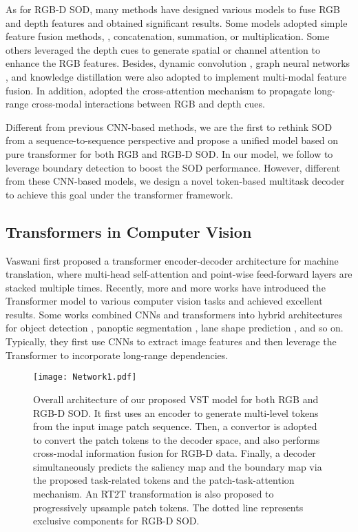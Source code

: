\documentclass[10pt,twocolumn,letterpaper]{article}
\begin{document}
As for RGB-D SOD, 
many methods have designed various models to fuse RGB and depth features and obtained significant results.
Some models \cite{chen2018progressively, chen2019three, Fu2020JLDCF} adopted simple feature fusion methods, \ie, concatenation, summation, or multiplication.
Some others \cite{zhao2019contrast, li2020icnet, Piao2019dmra, Li2020CMWNet} leveraged the depth cues to generate spatial or channel attention to enhance the RGB features.
Besides, dynamic convolution \cite{HDFNet-ECCV2020}, graph neural networks \cite{luo2020Cas-Gnn}, and knowledge distillation \cite{piao2020a2dele} were also adopted to implement multi-modal feature fusion.
In addition, \cite{liu2020S2MA, liu2020ReDWeb-S, chen2020dpanet} adopted the cross-attention mechanism to propagate long-range cross-modal interactions between RGB and depth cues.

Different from previous CNN-based methods, we are the first to rethink SOD from a sequence-to-sequence perspective and propose a unified model based on pure transformer 
for both RGB and RGB-D SOD. In our model, we follow \cite{qin2019basnet, zhao2019EGNet,CVPR2020_LDF,zhang2020select,Wei2020CoNet} to leverage boundary detection to boost the SOD performance. However, different from these CNN-based models, we design a novel token-based multitask decoder to achieve this goal under the transformer framework.

\subsection{Transformers in Computer Vision}
Vaswani \etal \cite{vaswani2017attention} first proposed a transformer encoder-decoder architecture for machine translation, where multi-head self-attention and point-wise feed-forward layers are stacked multiple times.
Recently, more and more works have introduced the Transformer model to various computer vision tasks and achieved excellent results. 
Some works combined CNNs and transformers into hybrid architectures for object detection \cite{carion2020end,zhu2020deformable}, panoptic segmentation \cite{wang2020maxdeeplab}, lane shape prediction \cite{liu2021end}, and so on.
Typically, they first use CNNs to extract image features and then leverage the Transformer to incorporate long-range dependencies.


\begin{figure*}[!t]
  \graphicspath{{Figures/Network/}}
  \centering
  \texttt{[image: Network1.pdf]}
  \caption{Overall architecture of our proposed VST model for both RGB and RGB-D SOD. It first uses an encoder to generate multi-level tokens from the input image patch sequence. Then, a convertor is adopted to convert the patch tokens to the decoder space, and also performs cross-modal information fusion for RGB-D data. Finally, a decoder simultaneously predicts the saliency map and the boundary map via the proposed task-related tokens and the patch-task-attention mechanism.
  An RT2T transformation is also proposed to progressively upsample patch tokens.
The dotted line represents exclusive components for RGB-D SOD.}
  \label{VST}
  \vspace{-0.4cm}
\end{figure*}
\end{document}
